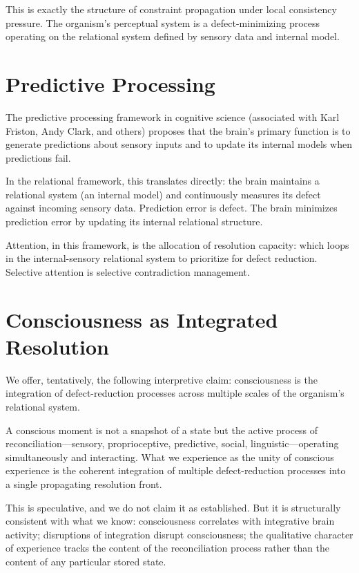 \documentclass[12pt,a4paper,openany]{book}
\theoremstyle{plain}
\theoremstyle{definition}
\theoremstyle{remark}
\begin{document}
This is exactly the structure of constraint propagation under local consistency pressure. The organism's perceptual system is a defect-minimizing process operating on the relational system defined by sensory data and internal model.

\section{Predictive Processing}

The predictive processing framework in cognitive science (associated with Karl Friston, Andy Clark, and others) proposes that the brain's primary function is to generate predictions about sensory inputs and to update its internal models when predictions fail.

In the relational framework, this translates directly: the brain maintains a relational system (an internal model) and continuously measures its defect against incoming sensory data. Prediction error is defect. The brain minimizes prediction error by updating its internal relational structure.

Attention, in this framework, is the allocation of resolution capacity: which loops in the internal-sensory relational system to prioritize for defect reduction. Selective attention is selective contradiction management.

\section{Consciousness as Integrated Resolution}

We offer, tentatively, the following interpretive claim: consciousness is the integration of defect-reduction processes across multiple scales of the organism's relational system.

A conscious moment is not a snapshot of a state but the active process of reconciliation---sensory, proprioceptive, predictive, social, linguistic---operating simultaneously and interacting. What we experience as the unity of conscious experience is the coherent integration of multiple defect-reduction processes into a single propagating resolution front.

This is speculative, and we do not claim it as established. But it is structurally consistent with what we know: consciousness correlates with integrative brain activity; disruptions of integration disrupt consciousness; the qualitative character of experience tracks the content of the reconciliation process rather than the content of any particular stored state.
\end{document}

